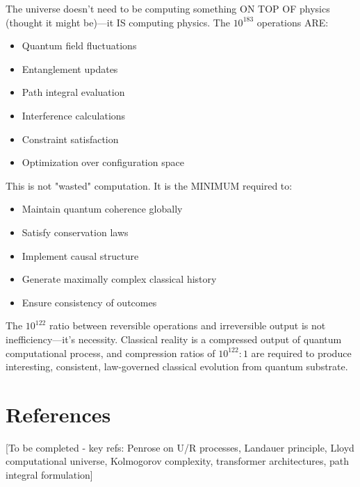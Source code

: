 ﻿\documentclass{article}
\begin{document}
The universe doesn’t need to be computing something ON TOP OF physics (thought it might be)—it IS computing physics. The $10^{183}$ operations ARE:
\begin{itemize}
\item Quantum field fluctuations
\item Entanglement updates
\item Path integral evaluation  
\item Interference calculations
\item Constraint satisfaction
\item Optimization over configuration space
\end{itemize}


This is not "wasted" computation. It is the MINIMUM required to:
\begin{itemize}
\item Maintain quantum coherence globally
\item Satisfy conservation laws
\item Implement causal structure
\item Generate maximally complex classical history
\item Ensure consistency of outcomes
\end{itemize}


The $10^{122}$ ratio between reversible operations and irreversible output is not inefficiency—it's necessity. Classical reality is a compressed output of quantum computational process, and compression ratios of $10^{122}:1$ are required to produce interesting, consistent, law-governed classical evolution from quantum substrate.




\section{References}






[To be completed - key refs: Penrose on U/R processes, Landauer principle, Lloyd computational universe, Kolmogorov complexity, transformer architectures, path integral formulation]
\end{document}
